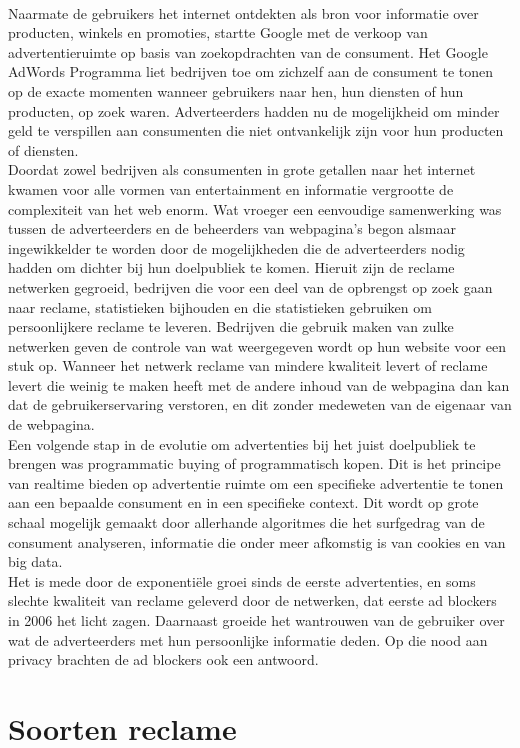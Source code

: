 \documentclass[pdftex,a4paper,12pt,twoside]{report}
\begin{document}
\\
Naarmate de gebruikers het internet ontdekten als bron voor informatie over producten, winkels en promoties, startte Google met de verkoop van advertentieruimte op basis van zoekopdrachten van de consument. Het Google AdWords Programma liet bedrijven toe om zichzelf aan de consument te tonen op de exacte momenten wanneer gebruikers naar hen, hun diensten of hun producten, op zoek waren. Adverteerders hadden nu de mogelijkheid om minder geld te verspillen aan consumenten die niet ontvankelijk zijn voor hun producten of diensten.
\\
Doordat zowel bedrijven als consumenten in grote getallen naar het internet kwamen voor alle vormen van entertainment en informatie vergrootte de complexiteit van het web enorm. Wat vroeger een eenvoudige samenwerking was tussen de adverteerders en de beheerders van webpagina’s begon alsmaar ingewikkelder te worden door de mogelijkheden die de adverteerders nodig hadden om dichter bij hun doelpubliek te komen. Hieruit zijn de reclame netwerken gegroeid, bedrijven die voor een deel van de opbrengst op zoek gaan naar reclame, statistieken bijhouden en die statistieken gebruiken om persoonlijkere reclame te leveren. Bedrijven die gebruik maken van zulke netwerken geven de controle van wat weergegeven wordt op hun website voor een stuk op. Wanneer het netwerk reclame van mindere kwaliteit levert of reclame levert die weinig te maken heeft met de andere inhoud van de webpagina dan kan dat de gebruikerservaring verstoren, en dit zonder medeweten van de eigenaar van de webpagina.
\\
Een volgende stap in de evolutie om advertenties bij het juist doelpubliek te brengen was programmatic buying of programmatisch kopen. Dit is het principe van realtime bieden op advertentie ruimte om een specifieke advertentie te tonen aan een bepaalde consument en in een specifieke context. Dit wordt op grote schaal mogelijk gemaakt door allerhande algoritmes die het surfgedrag van de consument analyseren, informatie die onder meer afkomstig is van cookies en van big data.
\\
Het is mede door de exponentiële groei sinds de eerste advertenties, en soms slechte kwaliteit van reclame geleverd door de netwerken, dat eerste ad blockers in 2006 het licht zagen. Daarnaast groeide het wantrouwen van de gebruiker over wat de adverteerders met hun persoonlijke informatie deden. Op die nood aan privacy brachten de ad blockers ook een antwoord.

\section{Soorten reclame}
\label{sec:Soorten reclame}
\end{document}
